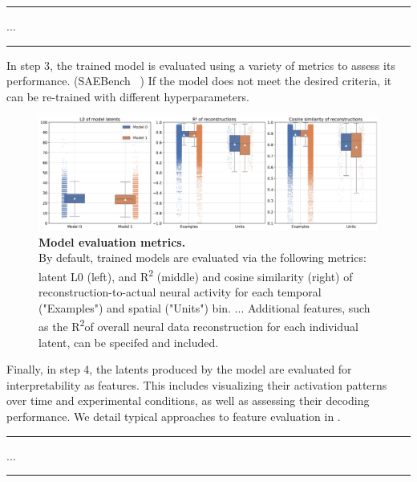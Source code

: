 \hrule
...
\hrule

In step 3, the trained model is evaluated using a variety of metrics to assess its performance. (SAEBench ~\cite{karvonen_2025_saebench}) If the model does not meet the desired criteria, it can be re-trained with different hyperparameters.

\begin{figure}[h]
    \centering
    \includegraphics[width=\linewidth]{figures/model_eval.pdf}
    \caption{
        \textbf{Model evaluation metrics.} \\
        \small By default, trained models are evaluated via the following metrics: latent L0 (left), and R\textsuperscript{2} (middle) and cosine similarity (right) of reconstruction-to-actual neural activity for each temporal ("Examples") and spatial ("Units") bin. ... Additional features, such as the R\textsuperscript{2}of overall neural data reconstruction for each individual latent, can be specifed and included.
    }
    \label{figure:model_eval}
\end{figure}

Finally, in step 4, the latents produced by the model are evaluated for interpretability as features. This includes visualizing their activation patterns over time and experimental conditions, as well as assessing their decoding performance. We detail typical approaches to feature evaluation in .

\hrule
...
\hrule

